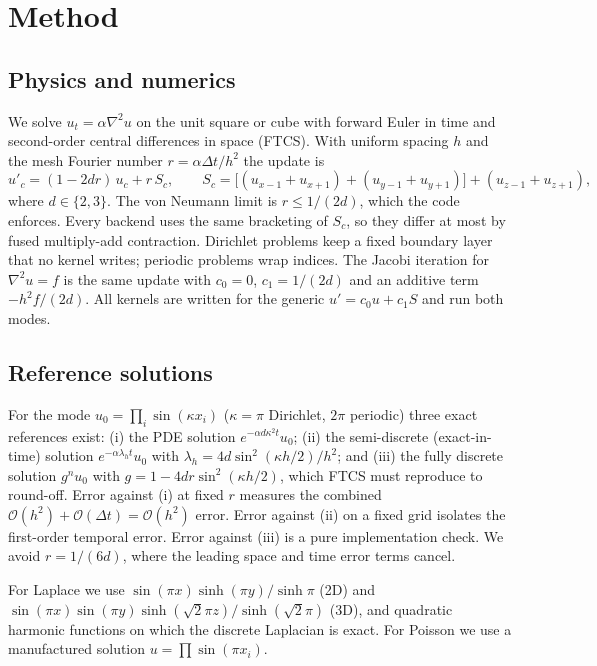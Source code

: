 \documentclass[11pt]{article}
\begin{document}
\section{Method}
\subsection{Physics and numerics}
We solve $u_t=\alpha\nabla^2u$ on the unit square or cube with forward Euler in time and
second-order central differences in space (FTCS). With uniform spacing $h$ and the mesh Fourier
number $r=\alpha\Delta t/h^2$ the update is
\begin{equation}
u'_c = (1-2dr)\,u_c + r\,S_c,\qquad
S_c=\big[(u_{x-1}+u_{x+1})+(u_{y-1}+u_{y+1})\big]+(u_{z-1}+u_{z+1}),
\label{eq:update}
\end{equation}
where $d\in\{2,3\}$. The von Neumann limit is $r\le 1/(2d)$, which the code enforces. Every
backend uses the same bracketing of $S_c$, so they differ at most by fused multiply-add
contraction. Dirichlet problems keep a fixed boundary layer that no kernel writes; periodic
problems wrap indices. The Jacobi iteration for $\nabla^2u=f$ is the same update with
$c_0=0$, $c_1=1/(2d)$ and an additive term $-h^2f/(2d)$. All kernels are written for the generic
$u'=c_0u+c_1S$ and run both modes.

\subsection{Reference solutions}
For the mode $u_0=\prod_i\sin(\kappa x_i)$ ($\kappa=\pi$ Dirichlet, $2\pi$ periodic) three exact
references exist:
(i) the PDE solution $e^{-\alpha d\kappa^2 t}u_0$;
(ii) the semi-discrete (exact-in-time) solution $e^{-\alpha\lambda_h t}u_0$ with
$\lambda_h=4d\sin^2(\kappa h/2)/h^2$; and
(iii) the fully discrete solution $g^n u_0$ with $g=1-4dr\sin^2(\kappa h/2)$, which FTCS must
reproduce to round-off. Error against (i) at fixed $r$ measures the combined
$\mathcal{O}(h^2)+\mathcal{O}(\Delta t)=\mathcal{O}(h^2)$ error. Error against (ii) on a fixed
grid isolates the first-order temporal error. Error against (iii) is a pure implementation
check. We avoid $r=1/(6d)$, where the leading space and time error terms cancel.

For Laplace we use $\sin(\pi x)\sinh(\pi y)/\sinh\pi$ (2D) and
$\sin(\pi x)\sin(\pi y)\sinh(\sqrt2\pi z)/\sinh(\sqrt2\pi)$ (3D), and quadratic harmonic
functions on which the discrete Laplacian is exact. For Poisson we use a manufactured solution
$u=\prod\sin(\pi x_i)$.
\end{document}
